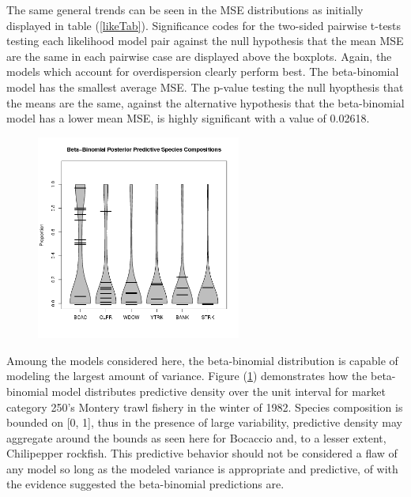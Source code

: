\documentclass[12pt]{article}
\begin{document}
%
The same general trends can be seen in the MSE distributions as initially 
displayed in table (\ref{likeTab}). Significance codes for the two-sided 
pairwise t-tests testing each likelihood model pair against the null hypothesis 
that the mean MSE are the same in each pairwise case are displayed above 
the boxplots. Again, the models which account for overdispersion clearly perform 
best. The beta-binomial model has the smallest average MSE. The p-value testing 
the null hyopthesis that the means are the same, against the alternative 
hypothesis that the beta-binomial model has a lower mean MSE, is highly 
significant with a value of 0.02618.  

%
\begin{figure}[h!]
\centering
\includegraphics[width=0.6\textwidth]{./pictures/compVioplotQtr2.png}
\label{violin}
\end{figure}

%
Amoung the models considered here, the beta-binomial distribution is capable of 
modeling the largest amount of variance. Figure (\ref{violin}) demonstrates how 
the beta-binomial model distributes predictive density over the unit interval 
for market category 250's Montery trawl fishery in the winter of 1982. Species 
composition is bounded on {[}0, 1{]}, thus in the presence of large variability, 
predictive density may aggregate around the bounds as seen here for Bocaccio 
and, to a lesser extent, Chilipepper rockfish. This predictive behavior should not 
be considered a flaw of any model so long as the modeled variance is appropriate 
and predictive, of with the evidence suggested the beta-binomial predictions are. 
\end{document}
